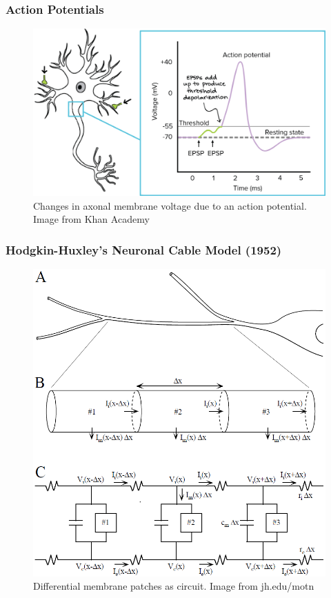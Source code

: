 \documentclass{beamer}
\begin{document}
\begin{frame}
\begin{columns}
\begin{column}{.5\textwidth}
    \end{column}
  \end{columns}
\end{frame}

\begin{frame}
\frametitle{Action Potentials}
\begin{figure}
\includegraphics[width=\textwidth]{actionpotential}
\caption{Changes in axonal membrane voltage due to an action potential. Image from Khan Academy}
\end{figure}
\end{frame}

\begin{frame}
\frametitle{Hodgkin-Huxley's Neuronal Cable Model (1952)}
\begin{figure}
\includegraphics[scale=0.4]{NeuronalCableModel}
\caption{Differential membrane patches as circuit. Image from jh.edu/motn}
\end{figure}
\end{frame}
\end{document}
